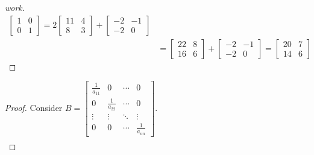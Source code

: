 \documentclass{article}
\begin{document}
\begin{enumerate}
\begin{proof}[work]
\begin{align*}
      \begin{bmatrix}
        1 & 0 \\
        0 & 1
      \end{bmatrix}=
      2\begin{bmatrix}
         11 & 4 \\
         8  & 3
       \end{bmatrix} +
      \begin{bmatrix}
        -2 & -1 \\
        -2 & 0
      \end{bmatrix}                             \\
                          & =
      \begin{bmatrix}
        22 & 8 \\
        16 & 6
      \end{bmatrix} +
      \begin{bmatrix}
        -2 & -1 \\
        -2 & 0
      \end{bmatrix} =
      \begin{bmatrix}
        20 & 7 \\
        14 & 6
      \end{bmatrix}
    \end{align*}
  \end{proof}
  \begin{proof}
    Consider $B = \begin{bmatrix}
        \frac{1}{a_{11}} & 0                & \cdots & 0                \\
        0                & \frac{1}{a_{22}} & \cdots & 0                \\
        \vdots           & \vdots           & \ddots & \vdots           \\
        0                & 0                & \cdots & \frac{1}{a_{nn}}
      \end{bmatrix}$.
    \begin{align*}

\end{align*}
\end{proof}
\end{enumerate}
\end{document}
